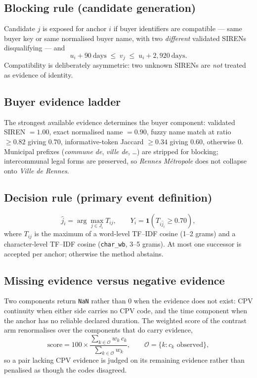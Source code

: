\subsection*{Blocking rule (candidate generation)}

Candidate $j$ is exposed for anchor $i$ if buyer identifiers are compatible --- same buyer key or same
normalised buyer name, with two \emph{different} validated SIRENs disqualifying --- and
\[
u_i + 90\ \text{days} \;\le\; v_j \;\le\; u_i + 2{,}920\ \text{days}.
\]
Compatibility is deliberately asymmetric: two unknown SIRENs are \emph{not} treated as evidence of identity.

\subsection*{Buyer evidence ladder}

The strongest available evidence determines the buyer component: validated SIREN $=1.00$, exact normalised
name $=0.90$, fuzzy name match at ratio $\ge 0.82$ giving $0.70$, informative-token Jaccard $\ge 0.34$ giving
$0.60$, otherwise $0$. Municipal prefixes (\emph{commune de}, \emph{ville de}, \dots) are stripped for
blocking; intercommunal legal forms are preserved, so \emph{Rennes Métropole} does not collapse onto
\emph{Ville de Rennes}.

\subsection*{Decision rule (primary event definition)}

\[
\hat{j}_i = \arg\max_{j \in J_i} T_{ij},
\qquad
Y_i = \mathbf{1}\!\left(T_{i\hat{j}_i} \ge 0.70\right),
\]
where $T_{ij}$ is the maximum of a word-level TF--IDF cosine (1--2 grams) and a character-level TF--IDF
cosine (\texttt{char\_wb}, 3--5 grams). At most one successor is accepted per anchor; otherwise the method
abstains.

\subsection*{Missing evidence versus negative evidence}

Two components return \texttt{NaN} rather than $0$ when the evidence does not exist: CPV continuity when
either side carries no CPV code, and the time component when the anchor has no reliable declared duration.
The weighted score of the contrast arm renormalises over the components that do carry evidence,
\[
\text{score} = 100 \times \frac{\sum_{k \in \mathcal{O}} w_k \, c_k}{\sum_{k \in \mathcal{O}} w_k},
\qquad \mathcal{O} = \{k : c_k \text{ observed}\},
\]
so a pair lacking CPV evidence is judged on its remaining evidence rather than penalised as though the codes
disagreed.

